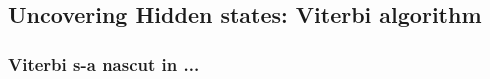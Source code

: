 \subsection[Viterbi algorithm]{Uncovering Hidden states: Viterbi algorithm}
\label{sec:viterbi}

\begin{frame}
  \frametitle{Viterbi s-a nascut in ...}
\end{frame}

